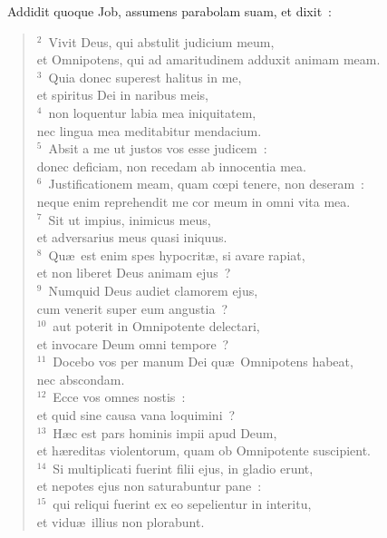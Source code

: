 ~\lettrine[lines=10,image=true,loversize=0.05,lraise=-0.03]{A}{}ddidit quoque Job, assumens parabolam suam, et dixit~:
\begin{flushleft}\begin{verse}\vspace{6pt}${}^{2}$~Vivit Deus, qui abstulit judicium meum,\\ et Omnipotens, qui ad amaritudinem adduxit animam meam.\\
${}^{3}$~Quia donec superest halitus in me,\\ et spiritus Dei in naribus meis,\\
${}^{4}$~non loquentur labia mea iniquitatem,\\ nec lingua mea meditabitur mendacium.\\
${}^{5}$~Absit a me ut justos vos esse judicem~:\\ donec deficiam, non recedam ab innocentia mea.\\
${}^{6}$~Justificationem meam, quam cœpi tenere, non deseram~:\\ neque enim reprehendit me cor meum in omni vita mea.\\
${}^{7}$~Sit ut impius, inimicus meus,\\ et adversarius meus quasi iniquus.\\
${}^{8}$~Qu\ae\ est enim spes hypocrit\ae , si avare rapiat,\\ et non liberet Deus animam ejus~?\\
${}^{9}$~Numquid Deus audiet clamorem ejus,\\ cum venerit super eum angustia~?\\
${}^{10}$~aut poterit in Omnipotente delectari,\\ et invocare Deum omni tempore~?\\
${}^{11}$~Docebo vos per manum Dei qu\ae\ Omnipotens habeat,\\ nec abscondam.\\
${}^{12}$~Ecce vos omnes nostis~:\\ et quid sine causa vana loquimini~?\\
${}^{13}$~H\ae c est pars hominis impii apud Deum,\\ et h\ae reditas violentorum, quam ob Omnipotente suscipient.\\
${}^{14}$~Si multiplicati fuerint filii ejus, in gladio erunt,\\ et nepotes ejus non saturabuntur pane~:\\
${}^{15}$~qui reliqui fuerint ex eo sepelientur in interitu,\\ et vidu\ae\ illius non plorabunt.\\

\end{verse}
\end{flushleft}
